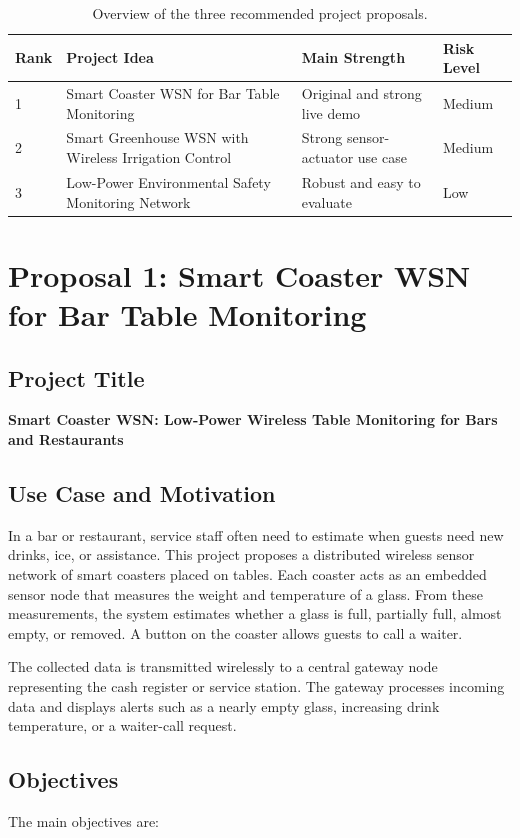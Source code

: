 \documentclass[11pt,a4paper]{article}
\newcommand{\projecttitle}[1]{\subsection*{#1}}
\begin{document}
\begin{table}[h]
    \centering
    \begin{tabularx}{\textwidth}{p{0.7cm} X p{2.7cm} p{2.4cm}}
        \toprule
        \textbf{Rank} & \textbf{Project Idea} & \textbf{Main Strength} & \textbf{Risk Level} \\
        \midrule
        1 & Smart Coaster WSN for Bar Table Monitoring
          & Original and strong live demo
          & Medium \\
        2 & Smart Greenhouse WSN with Wireless Irrigation Control
          & Strong sensor-actuator use case
          & Medium \\
        3 & Low-Power Environmental Safety Monitoring Network
          & Robust and easy to evaluate
          & Low \\
        \bottomrule
    \end{tabularx}
    \caption{Overview of the three recommended project proposals.}
\end{table}

\newpage

\section{Proposal 1: Smart Coaster WSN for Bar Table Monitoring}

\projecttitle{Project Title}

\textbf{Smart Coaster WSN: Low-Power Wireless Table Monitoring for Bars and Restaurants}

\projecttitle{Use Case and Motivation}

In a bar or restaurant, service staff often need to estimate when guests need new drinks, ice, or assistance. This project proposes a distributed wireless sensor network of smart coasters placed on tables. Each coaster acts as an embedded sensor node that measures the weight and temperature of a glass. From these measurements, the system estimates whether a glass is full, partially full, almost empty, or removed. A button on the coaster allows guests to call a waiter.

The collected data is transmitted wirelessly to a central gateway node representing the cash register or service station. The gateway processes incoming data and displays alerts such as a nearly empty glass, increasing drink temperature, or a waiter-call request.

\projecttitle{Objectives}

The main objectives are:
\end{document}
